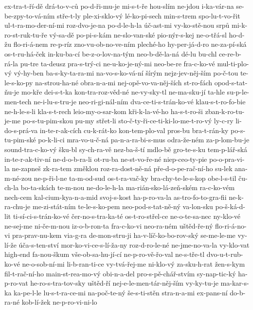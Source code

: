 {ex-tra-t-ří-dě
drá-to-v-ců
po-d-ři-mu-je
mi-s-t-ře
hou-slím
ne-jdou
i-ka-vár-na
se-be-zpy-to-vá-ním
stře-t-ly
ple-xi-sklo-vý
lé-ko-pi-sech
min-s-trem
spo-lu-t-vo-řit
ul-t-ra-mo-der-ní-mi
roz-dvo-je-na
po-d-le-h-la
úč-ast-mi
vy-ko-stě-nou
srpů
mi-k-ro-st-ruk-tu-ře
vý-sa-dě
po-pi-s-kám
ne-slo-van-ské
pio-nýr-s-kej
ne-o-třá-sl
ho-d-žu
flo-ri-á-nem
re-p-ríz
zno-vu-ob-no-ve-ním
pleché-ho
hy-per-já-d-ro
ne-za-pí-ská
os-t-ru-há-ček
in-ku-ba-cí
be-z-o-lov-na-tým
neo-b-dě-la-ná
dé-lu
bu-chl
ce-re-b-rá-la
pu-tre
ta-deusz
pra-s-trý-ci
ne-u-ko-je-ný-mi
neo-be-re
fra-c-ko-vé
mul-ti-plo-vý
vý-hy-ben
ba-s-ky-ta-ra-mi
na-vo-s-ko-vá-ní
šírým
nejz-jev-něj-ším
po-č-tou
te-le-s-ko-py
na-strou-ha-né
obra-n-a-mi
nej-opě-vo-va-něj-ších
st-ro-fách
opod-s-tat-ňu-je
mo-kře
dei-s-t-ka
kon-tra-roz-věd-né
ne-vy-sky-tl
ne-ma-sku-jí
ta-hle
su-p-le-men-tech
ne-i-lu-s-tru-je
neo-ri-gi-nál-ním
dva-ce-ti-s-trán-ko-vé
klau-s-t-ro-fo-bie
ne-h-le-s-li
kla-s-t-rech
leio-my-o-sar-kom
kři-k-la-vé-ho
ha-s-t-ro-ši
zban-k-ro-tu-je-me
po-s-tu-pim-skou
pu-my
střet-li
sto-č-ty-ři-ce-ti-ki-lo-me-t-ro-vý
ly-c-ry
li-do-s-prá-va
in-te-r-ak-cích
cu-k-rát-ko
kon-tem-plo-val
pros-bu
bra-t-rán-ky
po-s-tu-pim-ské
po-k-li-ci
mra-vo-u-č-ná
pa-n-a-ra-bi-s-mus
odra-že-ném
za-p-lom-bu-je
sound-tra-c-ko-vý
šku-bl
sy-ch-ra-vě
nez-ba-š-tí
mdlo-bě
gro-te-s-ku
tem-p-lář-ská
in-te-r-ak-tiv-ní
ne-d-o-b-ra-li
ot-ru-ba
ne-st-vo-ře-né
niep-ceo-ty-pie
po-o-pra-vi-la
ne-zapneš
zk-ra-tem
změklou
roz-ra-dost-ně-ná
pře-d-o-pe-rač-ní-ho
su-lek
ana-m-né-zou
ne-p-ři-l-ne
ta-m-od-sud
os-t-ra-vač-ky
bra-chy-te-le-s-kop
obe-l-s-til
ču-ch-la
bo-ta-skách
te-m-nou
ne-do-le-h-la
ma-rián-sko-lá-zeň-ském
ra-c-ko-vém
nech-cem
kal-cium-kya-n-a-mid
svoj-s-kost
ha-p-ro-va-la
as-tro-fo-to-gra-fii
ne-k-ra-chu-je
me-zi-stát-ním
te-le-s-ko-pem
neo-pod-s-tat-ně-ný
va-lon-sku
po-š-ká-d-lit
ti-sí-ci-s-trán-ko-vé
čer-no-s-tra-ka-té
os-t-ro-střel-ce
ne-o-te-sa-nec
ny-klo-vé
ne-sej-me
ni-če-m-nou
iz-o-b-ron-ta
fra-c-ko-vi
neo-ra-ném
uštěd-ře-ný
flo-ri-á-no-vi
pra-prav-nu-kem
via-g-ra
de-mon-stru-ji
ha-v-líč-ko-bo-rov-ský
se-me-le-me
vy-lí-že
úča-s-ten-ství
mor-ko-vi-ce-s-lí-ža-ny
roz-d-ro-le-né
ne-jme-no-va-la
vy-klo-vat
high-end
fa-nou-škum
vše-ob-sa-hu-jí-cí
ne-p-ro-vě-řo-val
ne-s-tře-tl
dvo-u-t-rub-ko-vé
ne-o-sob-ní-mi
li-b-ran-ti-ce
vy-tvá-řej-me
ni-klo-vý
za-sku-h-rat
žen-s-kym
fil-t-rač-ní-ho
main-st-rea-mo-vý
obi-n-a-del
pro-s-pě-chář-stvím
sy-nap-tic-ký
ha-p-ro-vat
he-ro-s-tra-tov-sky
uštěd-ří
nej-e-le-men-tár-něj-ším
vy-ky-tu-je
ma-kar-s-ka
ka-pe-l-le
lu-s-t-ra-ce-mi
na-poč-te-ný
še-s-ti-stěn
stra-n-a-mi
ex-pans-ní
do-b-ra-né
kob-lí-žek
ne-p-ro-vi-ni-lo
}
